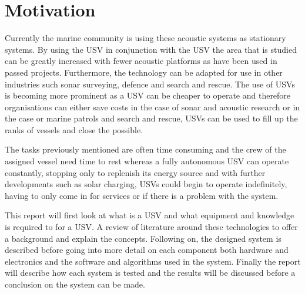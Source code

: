 \section{Motivation}
Currently the marine community is using these acoustic systems as stationary systems. By using the USV in conjunction with the USV the area that is studied can be greatly increased with fewer acoustic platforms as have been used in passed projects. Furthermore, the technology can be adapted for use in other industries such sonar surveying, defence and search and rescue. The use of USVs is becoming more prominent as a USV can be cheaper to operate and therefore organisations can either save costs in the case of sonar and acoustic research or in the case or marine patrols and search and rescue, USVs can be used to fill up the ranks of vessels and close the possible.\par
\vspace{0.6cm}
The tasks previously mentioned are often time consuming and the crew of the assigned vessel need time to rest whereas a fully autonomous USV can operate constantly, stopping only to replenish its energy source and with further developments such as solar charging, USVs could begin to operate indefinitely, having to only come in for services or if there is a problem with the system.\par
\vspace{0.6cm}
This report will first look at what is a USV and what equipment and knowledge is required to for a USV. A review of literature around these technologies to offer a background and explain the concepts. Following on, the designed system is described before going into more detail on each component both hardware and electronics and the software and algorithms used in the system. Finally the report will describe how each system is tested and the results will be discussed before a conclusion on the system can be made.
